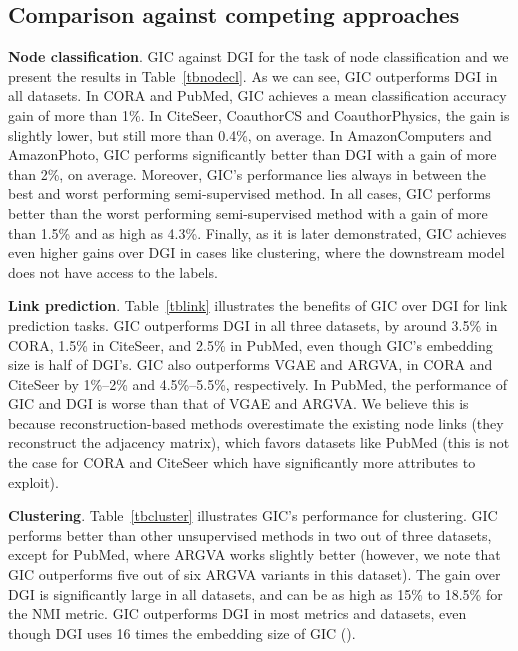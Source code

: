 \documentclass{article}
\begin{document}
\subsection{Comparison against competing approaches}
\textbf{Node classification}.
GIC against DGI for the task of node classification and we present the results in Table~\ref{tbnodecl}. As we can see, GIC outperforms DGI in all datasets. In CORA and PubMed, GIC achieves a mean classification accuracy gain of more than 1\%. In CiteSeer, CoauthorCS and CoauthorPhysics, the gain is slightly lower, but still more than 0.4\%, on average. In AmazonComputers and AmazonPhoto, GIC performs significantly better than DGI with a gain of more than 2\%, on average. Moreover, GIC's performance lies always in between the best and worst performing semi-supervised method. In all cases, GIC performs better than the worst performing semi-supervised method with a gain of more than 1.5\% and as high as 4.3\%. Finally, as it is later demonstrated, GIC achieves even higher gains over DGI in cases like clustering, where the downstream model does not have access to the labels. 





\noindent
\textbf{Link prediction}. Table~\ref{tblink} illustrates the benefits of GIC over DGI for link prediction tasks. GIC outperforms  DGI in all three datasets, by around 3.5\% in CORA, 1.5\% in CiteSeer, and 2.5\% in PubMed, even though GIC's embedding size is half of DGI's. GIC also outperforms VGAE and ARGVA, in CORA and CiteSeer by 1\%--2\% and 4.5\%--5.5\%, respectively. In PubMed, the performance of GIC and DGI is worse than that of VGAE and ARGVA. We believe this is because reconstruction-based methods overestimate the existing node links (they reconstruct the adjacency matrix), which favors datasets like PubMed (this is not the case for CORA and CiteSeer which have significantly more attributes to exploit). 

\noindent
\textbf{Clustering}. Table~\ref{tbcluster} illustrates GIC's performance for clustering. GIC performs better than other unsupervised methods in two out of three datasets, except for PubMed, where ARGVA works slightly better (however, we note that GIC outperforms five out of six ARGVA variants in this dataset). The gain over DGI is significantly large in all datasets, and can be as high as 15\% to 18.5\% for the NMI metric. GIC outperforms DGI in most metrics and datasets, even though DGI uses 16 times the embedding size of GIC (). 
\end{document}
